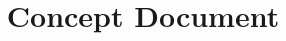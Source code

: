 \documentclass{article}
\title{\projectname Concept Document}
\date{\docdate}
\author{\authorname}
\begin{document}
\maketitle
\newpage

\tableofcontents
\newpage


\newpage

\printglossary

\glsaddall
\end{document}
